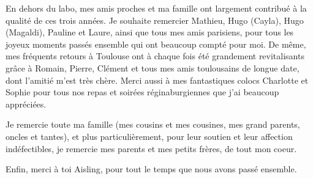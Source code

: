 En dehors du labo, mes amis proches et ma famille ont largement contribu\'e \`a la qualit\'e de ces trois ann\'ees. 
Je souhaite remercier Mathieu, Hugo (Cayla), Hugo (Magaldi), Pauline et Laure, ainsi que tous mes amis parisiens, 
pour tous les joyeux moments pass\'es ensemble qui ont beaucoup compt\'e pour moi.
De m\^eme, mes fr\'equents retours \`a Toulouse ont \`a chaque fois \'et\'e grandement revitalisants gr\^ace \`a Romain, Pierre, Cl\'ement 
et tous mes amis toulousains de longue date, dont l'amiti\'e m'est tr\`es ch\`ere. Merci aussi \`a mes fantastiques colocs Charlotte et Sophie
pour tous nos repas et soir\'ees r\'eginaburgiennes que j'ai beaucoup appr\'eci\'ees.

Je remercie toute ma famille (mes cousins et mes cousines, mes grand parents, oncles et tantes), et plus particuli\`erement,
pour leur soutien et leur affection ind\'efectibles, je remercie mes parents et mes petits fr\`eres, de tout mon coeur.

Enfin, merci \`a toi Aisling, pour tout le temps que nous avons pass\'e ensemble.



